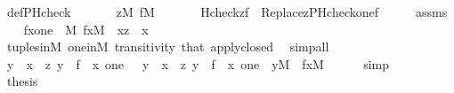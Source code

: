 \begin{isabellebody}
\ def{\isacharunderscore}{\kern0pt}PHcheck{\isacharcolon}{\kern0pt}\isanewline
\ \ \isanewline
\ \ \ \ {\isachardoublequoteopen}z{\isasymin}M{\isachardoublequoteclose}\ {\isachardoublequoteopen}f{\isasymin}M{\isachardoublequoteclose}\isanewline
\ \ \isanewline
\ \ \ \ {\isachardoublequoteopen}Hcheck{\isacharparenleft}{\kern0pt}z{\isacharcomma}{\kern0pt}f{\isacharparenright}{\kern0pt}\ {\isacharequal}{\kern0pt}\ Replace{\isacharparenleft}{\kern0pt}z{\isacharcomma}{\kern0pt}PHcheck{\isacharparenleft}{\kern0pt}one{\isacharcomma}{\kern0pt}f{\isacharparenright}{\kern0pt}{\isacharparenright}{\kern0pt}{\isachardoublequoteclose}\isanewline
%
\isadelimproof
%
\endisadelimproof
%
\isatagproof
{}\isamarkupfalse%
\ {\isacharminus}{\kern0pt}\isanewline
\ \ \isamarkupfalse%
\ assms\isanewline
\ \ \isamarkupfalse%
\ {\isachardoublequoteopen}{\isasymlangle}f{\isacharbackquote}{\kern0pt}x{\isacharcomma}{\kern0pt}one{\isasymrangle}\ {\isasymin}\ M{\isachardoublequoteclose}\ {\isachardoublequoteopen}f{\isacharbackquote}{\kern0pt}x{\isasymin}M{\isachardoublequoteclose}\ \ {\isachardoublequoteopen}x{\isasymin}z{\isachardoublequoteclose}\ \ x\isanewline
\ \ \ \ \isamarkupfalse%
\ tuples{\isacharunderscore}{\kern0pt}in{\isacharunderscore}{\kern0pt}M\ one{\isacharunderscore}{\kern0pt}in{\isacharunderscore}{\kern0pt}M\ transitivity\ that\ apply{\isacharunderscore}{\kern0pt}closed\ \isamarkupfalse%
\ simp{\isacharunderscore}{\kern0pt}all\isanewline
\ \ \isamarkupfalse%
\isanewline
\ \ \isamarkupfalse%
\ {\isachardoublequoteopen}{\isacharbraceleft}{\kern0pt}y\ {\isachardot}{\kern0pt}\ x\ {\isasymin}\ z{\isacharcomma}{\kern0pt}\ y\ {\isacharequal}{\kern0pt}\ {\isasymlangle}f\ {\isacharbackquote}{\kern0pt}\ x{\isacharcomma}{\kern0pt}\ one{\isasymrangle}{\isacharbraceright}{\kern0pt}\ {\isacharequal}{\kern0pt}\ \ {\isacharbraceleft}{\kern0pt}y\ {\isachardot}{\kern0pt}\ x\ {\isasymin}\ z{\isacharcomma}{\kern0pt}\ y\ {\isacharequal}{\kern0pt}\ {\isasymlangle}f\ {\isacharbackquote}{\kern0pt}\ x{\isacharcomma}{\kern0pt}\ one{\isasymrangle}\ {\isasymand}\ y{\isasymin}M\ {\isasymand}\ f{\isacharbackquote}{\kern0pt}x{\isasymin}M{\isacharbraceright}{\kern0pt}{\isachardoublequoteclose}\isanewline
\ \ \ \ \isamarkupfalse%
\ simp\isanewline
\ \ \isamarkupfalse%
\isanewline
\ \ \isamarkupfalse%
\ {\isacharquery}{\kern0pt}thesis\isanewline
\ \ \ \ \isamarkupfalse%

\end{isabellebody}
